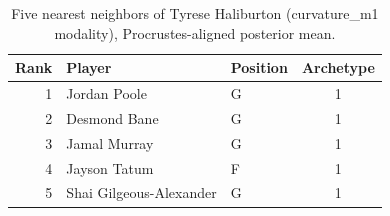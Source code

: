 \begin{table}[htbp]
  \centering\small
  \begin{tabular}{rllc}
    \toprule
    Rank & Player & Position & Archetype \\
    \midrule
    1 & Jordan Poole & G & 1 \\
    2 & Desmond Bane & G & 1 \\
    3 & Jamal Murray & G & 1 \\
    4 & Jayson Tatum & F & 1 \\
    5 & Shai Gilgeous-Alexander & G & 1 \\
    \bottomrule
  \end{tabular}
  \caption{Five nearest neighbors of Tyrese Haliburton (curvature_m1 modality), Procrustes-aligned posterior mean.}
  \label{tab:Tyrese_Haliburton_neighbors_curvature_m1}
\end{table}

